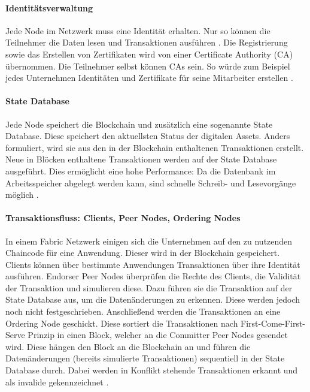 \paragraph{Identitätsverwaltung}
Jede Node im Netzwerk muss eine Identität erhalten. Nur so können die Teilnehmer die Daten lesen und Transaktionen ausführen \cite{SchererPerformanceScalabilityBlockchain2017}. Die Registrierung sowie das Erstellen von Zertifikaten wird von einer Certificate Authority (CA) übernommen. Die Teilnehmer selbst können CAs sein. So würde zum Beispiel jedes Unternehmen Identitäten und Zertifikate für seine Mitarbeiter erstellen \cite{HyperledgerFabricTeamCAHyperledgerFabric}.

\paragraph{State Database}
Jede Node speichert die Blockchain und zusätzlich eine sogenannte State Database. Diese speichert den aktuellsten Status der digitalen Assets. Anders formuliert, wird sie aus den in der Blockchain enthaltenen Transaktionen erstellt. Neue in Blöcken enthaltene Transaktionen werden auf der State Database ausgeführt. Dies ermöglicht eine hohe Performance: Da die Datenbank im Arbeitsspeicher abgelegt werden kann, sind schnelle Schreib- und Lesevorgänge möglich \cite{SchererPerformanceScalabilityBlockchain2017}.

\paragraph{Transaktionsfluss: Clients, Peer Nodes, Ordering Nodes}
In einem Fabric Netzwerk einigen sich die Unternehmen auf den zu nutzenden Chaincode für eine Anwendung. Dieser wird in der Blockchain gespeichert. Clients können über bestimmte Anwendungen Transaktionen über ihre Identität ausführen. Endorser Peer Nodes überprüfen die Rechte des Clients, die Validität der Transaktion und simulieren diese. Dazu führen sie die Transaktion auf der State Database aus, um die Datenänderungen zu erkennen. Diese werden jedoch noch nicht festgeschrieben. Anschließend werden die Transaktionen an eine Ordering Node geschickt. Diese sortiert die Transaktionen nach First-Come-First-Serve Prinzip in einen Block, welcher an die Committer Peer Nodes gesendet wird. Diese hängen den Block an die Blockchain an und führen die Datenänderungen (bereits simulierte Transaktionen) sequentiell in der State Database durch. Dabei werden in Konflikt stehende Transaktionen erkannt und als invalide gekennzeichnet \cite{SchererPerformanceScalabilityBlockchain2017}.

